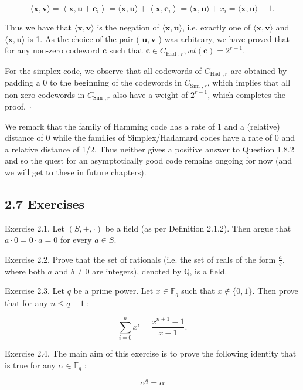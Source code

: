 \documentclass[10pt]{article}
\begin{document}
$$
\langle\mathbf{x}, \mathbf{v}\rangle=\left\langle\mathbf{x}, \mathbf{u}+\mathbf{e}_{i}\right\rangle=\langle\mathbf{x}, \mathbf{u}\rangle+\left\langle\mathbf{x}, \mathbf{e}_{i}\right\rangle=\langle\mathbf{x}, \mathbf{u}\rangle+x_{i}=\langle\mathbf{x}, \mathbf{u}\rangle+1 .
$$

Thus we have that $\langle\mathbf{x}, \mathbf{v}\rangle$ is the negation of $\langle\mathbf{x}, \mathbf{u}\rangle$, i.e. exactly one of $\langle\mathbf{x}, \mathbf{v}\rangle$ and $\langle\mathbf{x}, \mathbf{u}\rangle$ is 1. As the choice of the pair ( $\mathbf{u}, \mathbf{v}$ ) was arbitrary, we have proved that for any non-zero codeword $\mathbf{c}$ such that $\mathbf{c} \in C_{\text {Had }, r}, w t(\mathbf{c})=2^{r-1}$.

For the simplex code, we observe that all codewords of $C_{\text {Had }, r}$ are obtained by padding a 0 to the beginning of the codewords in $C_{\text {Sim }, r}$, which implies that all non-zero codewords in $C_{\text {Sim }, r}$ also have a weight of $2^{r-1}$, which completes the proof. \(\square\)

We remark that the family of Hamming code has a rate of 1 and a (relative) distance of 0 while the families of Simplex/Hadamard codes have a rate of 0 and a relative distance of 1/2. Thus neither gives a positive answer to Question 1.8.2 and so the quest for an asymptotically good code remains ongoing for now (and we will get to these in future chapters).

\subsection*{2.7 Exercises}
Exercise 2.1. Let $(S,+, \cdot)$ be a field (as per Definition 2.1.2). Then argue that $a \cdot 0=0 \cdot a=0$ for every $a \in S$.

Exercise 2.2. Prove that the set of rationals (i.e. the set of reals of the form $\frac{a}{b}$, where both $a$ and $b \neq 0$ are integers), denoted by $\mathbb{Q}$, is a field.

Exercise 2.3. Let $q$ be a prime power. Let $x \in \mathbb{F}_{q}$ such that $x \notin\{0,1\}$. Then prove that for any $n \leq q-1$ :

$$
\sum_{i=0}^{n} x^{i}=\frac{x^{n+1}-1}{x-1} .
$$

Exercise 2.4. The main aim of this exercise is to prove the following identity that is true for any $\alpha \in \mathbb{F}_{q}$ :


\begin{equation*}
\alpha^{q}=\alpha \tag{2.4}
\end{equation*}
\end{document}
